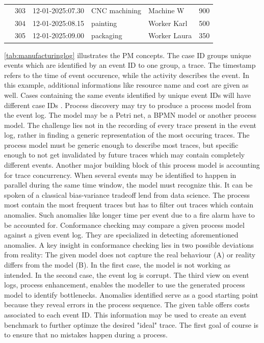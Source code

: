 \begin{table}[htbp]
{\begin{tabular}{r r l l l r}
                       & 303               & 12-01-2025:07.30   & CNC machining         & Machine W         & 900           \\
                       & 304               & 12-01-2025:08.15   & painting              & Worker Karl       & 500           \\
                       & 305               & 12-01-2025:09.00   & packaging             & Worker Laura      & 350           \\
      \bottomrule
    \end{tabular}%
  }
\end{table}

\autoref{tab:manufacturinglog} illustrates the PM concepts. The case ID groups unique events which are identified by an event ID to one group, a trace. The timestamp refers to the time of event occurence, while the activity describes the event. In this example, additional informations like resource name and cost are given as well. Cases containing the same events identified by unique event IDs will have different case IDs \autocite{van2016data}. Process discovery may try to produce a process model from the event log. The model may be a Petri net, a BPMN model or another process model. The challenge lies not in the recording of every trace present in the event log, rather in finding a generic representation of the most occuring traces. The process model must be generic enough to describe most traces, but specific enough to not get invalidated by future traces which may contain completely different events. Another major building block of this process model is accounting for trace concurrency. When several events may be identified to happen in parallel during the same time window, the model must recognize this. It can be spoken of a classical bias-variance tradeoff lend from data science. The process most contain the most frequent traces but has to filter out traces which contain anomalies. Such anomalies like longer time per event due to a fire alarm have to be accounted for. Conformance checking may compare a given process model against a given event log. They are specialized in detecting aforementioned anomalies. A key insight in conformance checking lies in two possible deviations from reality: The given model does not capture the real behaviour (A) or reality differs from the model (B). In the first case, the model is not working as intended. In the second case, the event log is corrupt. The third view on event logs, process enhancement, enables the modeller to use the generated process model to identify bottlenecks. Anomalies identified serve as a good starting point because they reveal errors in the process sequence. The given table offers costs associated to each event ID. This information may be used to create an event benchmark to further optimze the desired "ideal" trace. The first goal of course is to ensure that no mistakes happen during a process.

